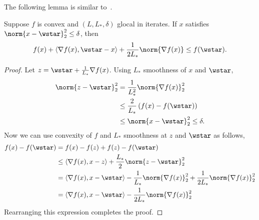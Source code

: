 \documentclass[10pt]{article} %
\newcommand{\grad}{\nabla{} f}
\newcommand{\rbr}[1]{\left(#1\right)}
\newcommand{\abr}[1]{\left\langle#1\right\rangle}
\begin{document}
The following lemma is similar to~\cite[Theorem~3.1]{drori2018properties}.
\begin{lemma}\label{lemma:restricted-dual-sc-iterates}
    Suppose \( f \) is convex and \( (L, L_*, \delta) \) 
    glocal in iterates.
    If \( x \) satisfies \( \norm{x - \wstar}_2^2 \leq \delta \), then 
    \begin{align*}
        f(x) + \abr{\grad(x), \wstar - x} + \frac{1}{2L_*} \norm{\grad(x)}
        \leq f(\wstar).
    \end{align*}
\end{lemma}
\begin{proof}
    Let \( z = \wstar + \frac{1}{L_*} \grad(x) \).
    Using \( L_* \) smoothness of \( x \) and \( \wstar \),
    \begin{align*}
        \norm{z - \wstar}_2^2 
        &= \frac{1}{L_*^2} \norm{\grad(x)}_2^2\\ 
        &\leq \frac{2}{L_*} \rbr{f(x) - f(\wstar)}\\
        &\leq \norm{x - \wstar}_2^2 \leq \delta.
    \end{align*}
    Now we can use convexity of \( f \) and \( L_* \) smoothness 
    at \( z \) and \( \wstar \) as follows,
    \begin{align*}
        f(x) - f(\wstar)
        &= f(x) - f(z) + f(z) - f(\wstar)\\
        &\leq \abr{\grad(x), x - z} + \frac{L_*}{2}\norm{z - \wstar}_2^2 \\
        &= \abr{\grad(x), x - \wstar} - \frac{1}{L_*} \norm{\grad(x)}_2^2
        + \frac{1}{2L_*}\norm{\grad(x)}_2^2\\
        &= \abr{\grad(x), x - \wstar} - \frac{1}{2L_*} \norm{\grad(x)}_2^2
    \end{align*}
    Rearranging this expression completes the proof.
\end{proof}
\fi
\end{document}

